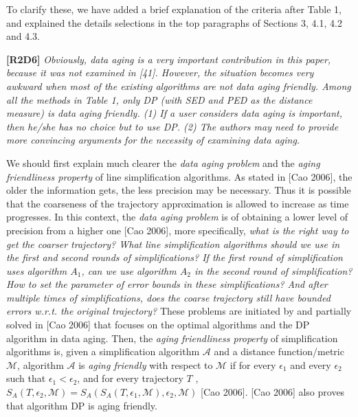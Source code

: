 \documentclass{letter}
\newcommand{\wrt}{\emph{w.r.t.}\xspace}
\begin{document}
{To clarify these, we have added a brief explanation of the criteria after Table 1, and explained the details selections in the top paragraphs of Sections 3, 4.1, 4.2 and 4.3. 

\textbf{[R2D6]} \emph{Obviously, data aging is a very important contribution in this paper, because it was not examined in [41]. However, the situation becomes very awkward when most of the existing algorithms are not data aging friendly. Among all the methods in Table 1, only DP (with SED and PED as the distance measure) is data aging friendly. (1) {If a user considers data aging is important, then he/she has no choice but to use DP}. (2) {The authors may need to provide more convincing arguments for the necessity of examining data aging}.}

We should first explain much clearer the \emph{data aging problem} and the \emph{aging friendliness property} of line simplification algorithms. 
%
As stated in [Cao 2006], the older the information gets, the less precision may be necessary. Thus it is possible that the coarseness of the trajectory approximation is allowed to increase as time progresses. In this context, the \emph{data aging problem} is of obtaining a lower level of precision from a higher one [Cao 2006], more specifically, \emph{what is the right way to get the coarser trajectory? What line simplification algorithms should we use in the first and second rounds of simplifications? If the first round of simplification uses algorithm $A_1$, can we use algorithm $A_2$ in the second round of simplification? How to set the parameter of error bounds in these simplifications? And after multiple times of simplifications, does the coarse trajectory still have bounded errors \wrt the original trajectory?} These problems are initiated by and partially solved in [Cao 2006] that focuses on the optimal algorithms and the DP algorithm in data aging.
Then, the \emph{aging friendliness property} of simplification algorithms is,  given a simplification algorithm $\mathcal{A}$ and a distance function/metric $\mathcal{M}$, algorithm $\mathcal{A}$ is \emph{aging friendly} with respect to  $\mathcal{M}$ if for every $\epsilon_1$ and every $\epsilon_2$ such that $\epsilon_1 <\epsilon_2$, and
for every trajectory $T$ , $S_A(T, \epsilon_2,\mathcal{M}) = S_A(S_A(T, \epsilon_1,\mathcal{M}), \epsilon_2, \mathcal{M})$ [Cao 2006]. [Cao 2006] also proves that algorithm DP is aging friendly.

}
\end{document}
